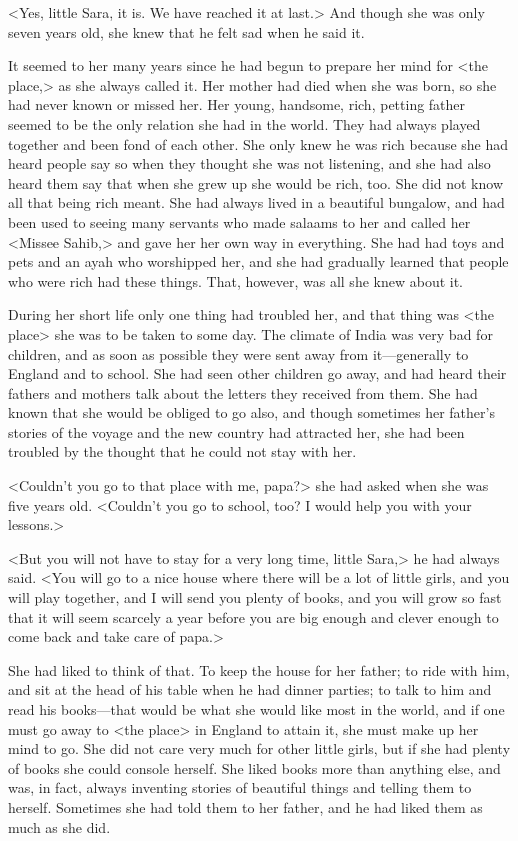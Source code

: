 <Yes, little Sara, it is. We have reached it at last.> And though she was only seven years old, she knew that he felt sad when he said it.

It seemed to her many years since he had begun to prepare her mind for <the place,> as she always called it. Her mother had died when she was born, so she had never known or missed her. Her young, handsome, rich, petting father seemed to be the only relation she had in the world. They had always played together and been fond of each other. She only knew he was rich because she had heard people say so when they thought she was not listening, and she had also heard them say that when she grew up she would be rich, too. She did not know all that being rich meant. She had always lived in a beautiful bungalow, and had been used to seeing many servants who made salaams to her and called her <Missee Sahib,> and gave her her own way in everything. She had had toys and pets and an ayah who worshipped her, and she had gradually learned that people who were rich had these things. That, however, was all she knew about it.

During her short life only one thing had troubled her, and that thing was <the place> she was to be taken to some day. The climate of India was very bad for children, and as soon as possible they were sent away from it—generally to England and to school. She had seen other children go away, and had heard their fathers and mothers talk about the letters they received from them. She had known that she would be obliged to go also, and though sometimes her father's stories of the voyage and the new country had attracted her, she had been troubled by the thought that he could not stay with her.

<Couldn't you go to that place with me, papa?> she had asked when she was five years old. <Couldn't you go to school, too? I would help you with your lessons.>

<But you will not have to stay for a very long time, little Sara,> he had always said. <You will go to a nice house where there will be a lot of little girls, and you will play together, and I will send you plenty of books, and you will grow so fast that it will seem scarcely a year before you are big enough and clever enough to come back and take care of papa.>

She had liked to think of that. To keep the house for her father; to ride with him, and sit at the head of his table when he had dinner parties; to talk to him and read his books—that would be what she would like most in the world, and if one must go away to <the place> in England to attain it, she must make up her mind to go. She did not care very much for other little girls, but if she had plenty of books she could console herself. She liked books more than anything else, and was, in fact, always inventing stories of beautiful things and telling them to herself. Sometimes she had told them to her father, and he had liked them as much as she did.

